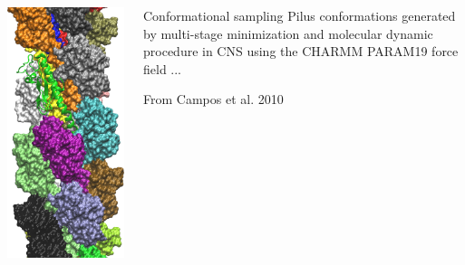 \begin{frame}[fragile]
\begin{columns}
\begin{column}{.25\textwidth}
\includegraphics[width=\textwidth]{figures/20mer.png}
\end{column}
\begin{column}{.75\textwidth}
\begin{block}{Conformational sampling}
Pilus conformations generated by multi-stage minimization and molecular dynamic procedure in CNS using the CHARMM PARAM19 force field ...
\end{block}
\footnotesize{From Campos et al. 2010}
\end{column}
\end{columns}
\end{frame}
